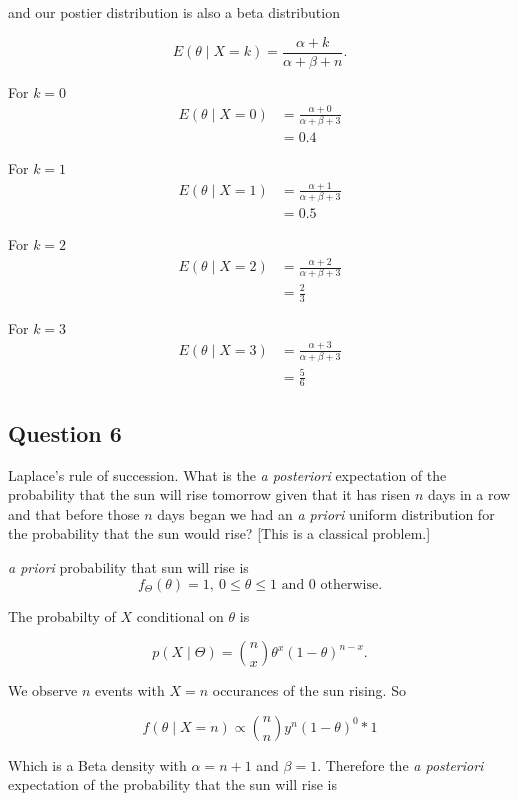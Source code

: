 \documentclass{tufte-book}
\theoremstyle{mytheoremstyle}
\theoremstyle{mylemstyle}
\theoremstyle{mydefstyle}
\begin{document}
and our postier distribution is also a beta distribution

\[ E(\theta \mid X=k) = \frac{\alpha + k}{\alpha+\beta + n}. \]

For $k=0$
\begin{align*}
E(\theta \mid X=0) &= \frac{\alpha + 0}{\alpha+\beta + 3}\\
&= 0.4
\end{align*}

For $k=1$
\begin{align*}
E(\theta \mid X=1) &= \frac{\alpha + 1}{\alpha+\beta + 3}\\
&= 0.5
\end{align*}

For $k=2$
\begin{align*}
E(\theta \mid X=2) &= \frac{\alpha + 2}{\alpha+\beta + 3}\\
&= \frac{2}{3}
\end{align*}

For $k=3$
\begin{align*}
E(\theta \mid X=3) &= \frac{\alpha + 3}{\alpha+\beta + 3}\\
&= \frac{5}{6}
\end{align*}


\subsection{Question 6}
Laplace's rule of succession.  What is the \textit{a posteriori} expectation of the probability that the sun will rise tomorrow given that it has risen $n$ days in a row and that before those $n$ days began we had an \textit{a priori} uniform distribution for the probability that the sun would rise? [This is a classical problem.]

 \textit{a priori} probability that sun will rise is
\[f_\Theta(\theta) = 1 , \ 0\leq \theta \leq 1 \text{ and } 0 \text{ otherwise.}\]

The probabilty of $X$ conditional on $\theta$ is

\[ p(X \mid \Theta) = \binom{n}{x}\theta^x(1-\theta)^{n-x}. \]

We observe $n$ events with $X=n$ occurances of the sun rising.  So

\[ f(\theta \mid X=n) \propto \binom{n}{n} y^n (1-\theta)^0 * 1\]

Which is a Beta density with $\alpha=n+1$ and $\beta=1$.  Therefore the \textit{a posteriori} expectation of the probability that the sun will rise is
\end{document}
